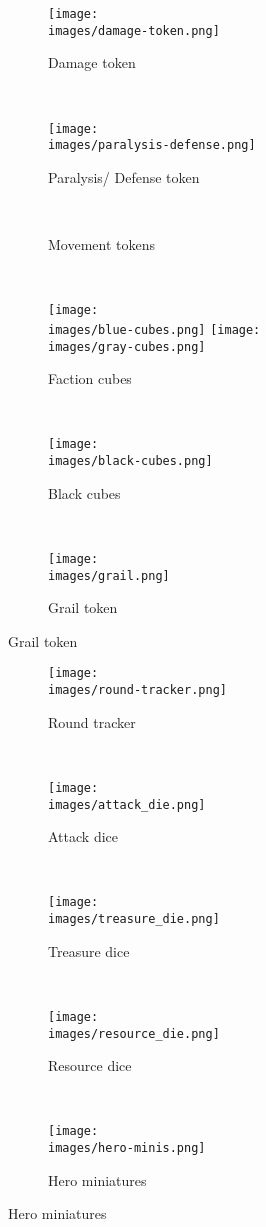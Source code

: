 \begin{figure}[H]
  \centering
  \begin{subfigure}[b]{0.08\linewidth}
    \centering
    \texttt{[image: \\images/damage-token.png]}
    \caption{\centering Damage token}
  \end{subfigure}
  ~
  \begin{subfigure}[b]{0.15\linewidth}
    \centering
    \texttt{[image: \\images/paralysis-defense.png]}
    \caption{\centering Paralysis/ Defense token}
  \end{subfigure}
  ~
  \begin{subfigure}[b]{0.15\linewidth}
    
    \caption{\centering Movement tokens}
  \end{subfigure}
  ~
  \begin{subfigure}[b]{0.15\linewidth}
    \centering
    \texttt{[image: \\images/blue-cubes.png]}
    \texttt{[image: \\images/gray-cubes.png]}
    \caption{\centering Faction cubes}
  \end{subfigure}
  ~
  \begin{subfigure}[b]{0.15\linewidth}
    \texttt{[image: \\images/black-cubes.png]}
    \caption{\centering Black cubes}
  \end{subfigure}
  ~
  \begin{subfigure}[b]{0.15\linewidth}
    \texttt{[image: \\images/grail.png]}
    \caption{\centering Grail token}
  \end{subfigure}
\end{figure}
\vspace*{-2em}
\begin{figure}[H]
  \centering
  \begin{subfigure}[b]{0.3\linewidth}
    \texttt{[image: \\images/round-tracker.png]}
    \caption{\centering Round tracker}
  \end{subfigure}
  ~
  \begin{subfigure}[b]{0.07\linewidth}
    \texttt{[image: \\images/attack\_die.png]}
    \caption{\centering Attack dice}
  \end{subfigure}
  ~
  \begin{subfigure}[b]{0.1\linewidth}
    \texttt{[image: \\images/treasure\_die.png]}
    \caption{\centering Treasure dice}
  \end{subfigure}
  ~
  \begin{subfigure}[b]{0.1\linewidth}
    \texttt{[image: \\images/resource\_die.png]}
    \caption{\centering Resource dice}
  \end{subfigure}
  ~
  \begin{subfigure}[b]{0.3\linewidth}
    \texttt{[image: \\images/hero-minis.png]}
    \vspace*{-2em}
    \caption{\centering Hero miniatures}
  \end{subfigure}
\end{figure}
